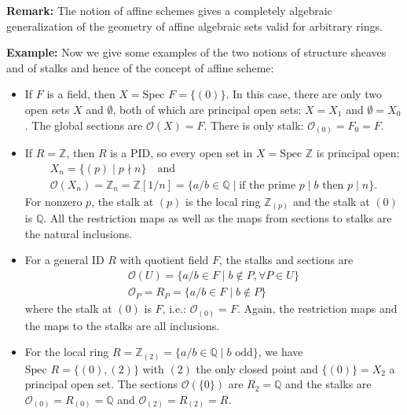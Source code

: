 \noindent\textbf{Remark:} The notion of affine schemes gives a completely algebraic generalization of the geometry of affine algebraic sets valid for arbitrary rings.

\noindent\textbf{Example:} Now we give some examples of the two notions of structure sheaves and of stalks and hence of the concept of affine scheme:
\begin{itemize}
    \item If $F$ is a field, then $X=\text{Spec }F= \{(0)\}$. In this case, there are only two open sets $X$ and $\emptyset$, both of which are principal open sets: $X=X_1$ and $\emptyset =X_0$. The global sections are $\mathcal{O}(X) =F$. There is only stalk: $\mathcal{O} _{(0)} =F_0=F$.

    \item If $R=\mathbb{Z}$, then $R$ is a PID, so every open set in $X=\text{Spec }\mathbb{Z}$ is principal open:
    \begin{gather*}
    X_n = \{(p) \mid p \nmid n\} \quad \text{and} \\
    \mathcal{O}(X_n) = \mathbb{Z}_n = \mathbb{Z}[1/n] = \{a/b \in \mathbb{Q} \mid \text{if the prime } p \mid b \text{ then } p \mid n\}.
    \end{gather*}
    For nonzero $p$, the stalk at $(p)$ is the local ring $\mathbb{Z}_{(p)}$ and the stalk at $(0)$ is $\mathbb{Q}$. All the restriction maps as well as the maps from sections to stalks are the natural inclusions.

    \item For a general ID $R$ with quotient field $F$, the stalks and sections are
    \begin{gather*}
    \mathcal{O} (U)= \{a/b\in F \mid b\notin P,\forall P\in U\}\\
    \mathcal{O}_P=R_P= \{a/b \in F\mid b\notin P\}
    \end{gather*}
    where the stalk at $(0)$ is $F$, i.e.: $\mathcal{O}_{(0)}= F$. Again, the restriction maps and the maps to the stalks are all inclusions.

    \item For the local ring $R= \mathbb{Z}_{(2)} =\{ a/b\in \mathbb{Q} \mid b\text{ odd} \}$, we have $\text{Spec }R=\{(0) ,(2)\}$ with $(2)$ the only closed point and $\{(0) \}=X_2$ a principal open set. The sections $\mathcal{O} (\{0\})$ are $R_2=\mathbb{Q}$ and the stalks are $\mathcal{O}_{(0)}=R_{(0)} =\mathbb{Q}$ and $\mathcal{O}_{(2)} =R_{(2)} =R$.
\end{itemize}

